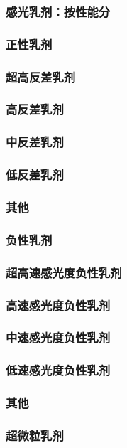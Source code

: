 \documentclass[UTF8]{../../ApplicationUniverse}
\begin{document}
    \subsubsection{感光乳剂：按性能分}
        \subsubsection{正性乳剂}
            \subsubsection{超高反差乳剂}
            \subsubsection{高反差乳剂}
            \subsubsection{中反差乳剂}
            \subsubsection{低反差乳剂}
            \subsubsection{其他}
        \subsubsection{负性乳剂}
            \subsubsection{超高速感光度负性乳剂}
            \subsubsection{高速感光度负性乳剂}
            \subsubsection{中速感光度负性乳剂}
            \subsubsection{低速感光度负性乳剂}
            \subsubsection{其他}
        \subsubsection{超微粒乳剂}
\end{document}
